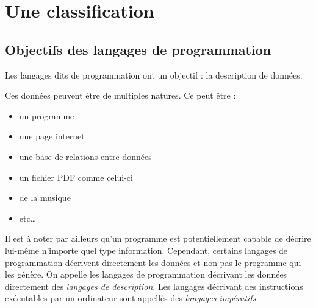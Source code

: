 \documentclass[../../main.tex]{subfiles}
\begin{document}
\section{Une classification}
\subsection{Objectifs des langages de programmation}
Les langages dits \og de programmation \fg ont un objectif : la description de données.

Ces données peuvent être de multiples natures. Ce peut être :
\begin{itemize}
	\item un programme
	\item une page internet
	\item une base de relations entre données
	\item un fichier PDF comme celui-ci
	\item de la musique
	\item etc\dots
\end{itemize}
Il est à noter par ailleurs qu'un programme est potentiellement capable de décrire lui-même n'importe quel type information. Cependant, certains langages de programmation décrivent directement les données et non pas le programme qui les génère. On appelle les langages de programmation décrivant les données directement des \textit{langages de description}. Les langages décrivant des instructions exécutables par un ordinateur sont appellés des \textit{langages impératifs}.
\end{document}
